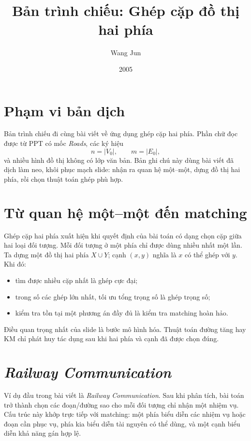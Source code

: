 \documentclass[11pt]{article}
\title{Bản trình chiếu: Ghép cặp đồ thị hai phía}
\author{Wang Jun}
\date{2005}
\begin{document}
\maketitle


\section{Phạm vi bản dịch}

Bản trình chiếu đi cùng bài viết về ứng dụng ghép cặp hai phía. Phần chữ đọc
được từ PPT có mốc \textit{Roads}, các ký hiệu
\[
  n=|V_0|,\qquad m=|E_0|,
\]
và nhiều hình đồ thị không có lớp văn bản. Bản ghi chú này dùng bài viết đã
dịch làm neo, khôi phục mạch slide: nhận ra quan hệ một--một, dựng đồ thị hai
phía, rồi chọn thuật toán ghép phù hợp.

\section{Từ quan hệ một--một đến matching}

Ghép cặp hai phía xuất hiện khi quyết định của bài toán có dạng chọn cặp giữa
hai loại đối tượng. Mỗi đối tượng ở một phía chỉ được dùng nhiều nhất một lần.
Ta dựng một đồ thị hai phía \(X\cup Y\); cạnh \((x,y)\) nghĩa là \(x\) có thể
ghép với \(y\). Khi đó:
\begin{itemize}
  \item tìm được nhiều cặp nhất là ghép cực đại;
  \item trong số các ghép lớn nhất, tối ưu tổng trọng số là ghép trọng số;
  \item kiểm tra tồn tại một phương án đầy đủ là kiểm tra matching hoàn hảo.
\end{itemize}

Điều quan trọng nhất của slide là bước mô hình hóa. Thuật toán đường tăng hay
KM chỉ phát huy tác dụng sau khi hai phía và cạnh đã được chọn đúng.

\section{\textit{Railway Communication}}

Ví dụ đầu trong bài viết là \textit{Railway Communication}. Sau khi phân tích,
bài toán trở thành chọn các đoạn/đường sao cho mỗi đối tượng chỉ nhận một
nhiệm vụ. Cấu trúc này khớp trực tiếp với matching: một phía biểu diễn các
nhiệm vụ hoặc đoạn cần phục vụ, phía kia biểu diễn tài nguyên có thể dùng, và
một cạnh biểu diễn khả năng gán hợp lệ.
\end{document}
